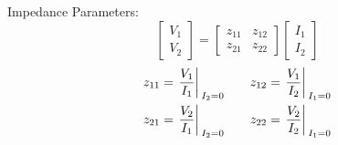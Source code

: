 \begin{multicols}{2}
\begin{CheatsheetEntryFrame}
        Impedance Parameters:
        \begin{equation*}
            \begin{bmatrix}
                V_1 \\
                V_2
            \end{bmatrix}
            =
            \begin{bmatrix}
                z_{11} & z_{12} \\
                z_{21} & z_{22}
            \end{bmatrix}
            \begin{bmatrix}
                I_1 \\
                I_2
            \end{bmatrix}
        \end{equation*}
        \begin{align*}
            z_{11} &= {\left.\frac{V_1}{I_1}\right\rvert{}}_{I_2 = 0} \quad &
            z_{12} &= {\left.\frac{V_1}{I_2}\right\rvert{}}_{I_1 = 0} \\
            z_{21} &= {\left.\frac{V_2}{I_1}\right\rvert{}}_{I_2 = 0} \quad &
            z_{22} &= {\left.\frac{V_2}{I_2}\right\rvert{}}_{I_1 = 0}
        \end{align*}


\end{CheatsheetEntryFrame}
\end{multicols}
